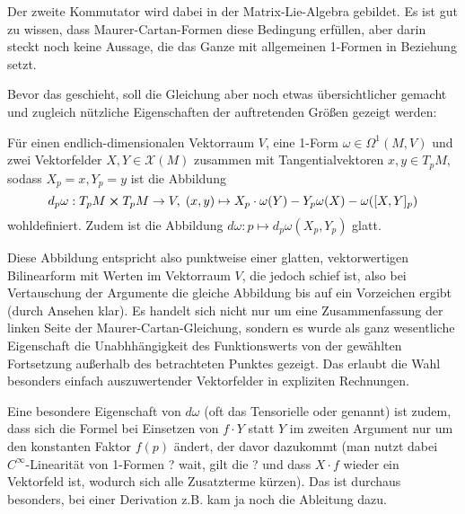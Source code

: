 \documentclass[../H_Analysis_main.tex]{subfiles}
\begin{document}
Der zweite Kommutator wird dabei in der Matrix-Lie-Algebra gebildet. Es ist gut zu wissen, dass Maurer-Cartan-Formen diese Bedingung erfüllen, aber darin steckt noch keine Aussage, die das Ganze mit allgemeinen 1-Formen in Beziehung setzt.

Bevor das geschieht, soll die Gleichung aber noch etwas übersichtlicher gemacht und zugleich nützliche Eigenschaften der auftretenden Größen gezeigt werden:
\begin{lemma}\label{lemma:fakedifferential}
Für einen endlich-dimensionalen Vektorraum $V$, eine 1-Form $\omega \in \Omega^1(M, V)$ und zwei Vektorfelder $X, Y \in \mathcal{X}(M)$ zusammen mit Tangentialvektoren $x, y \in T_p M $, sodass $X_p = x, Y_p = y$ ist die Abbildung
\begin{equation}
d_p \omega: T_p M \cross T_p M \rightarrow V, \; (x, y) \mapsto X_p \cdot \omega(Y) - Y_p \omega(X) - \omega\qty([X, Y]_p)
\end{equation}
wohldefiniert. Zudem ist die Abbildung $d\omega: p \mapsto d_p \omega(X_p, Y_p)$ glatt.
\end{lemma}

Diese Abbildung entspricht also punktweise einer glatten, vektorwertigen Bilinearform mit Werten im Vektorraum $V$, die jedoch schief ist, also bei Vertauschung der Argumente die gleiche Abbildung bis auf ein Vorzeichen ergibt (durch Ansehen klar). Es handelt sich nicht nur um eine Zusammenfassung der linken Seite der Maurer-Cartan-Gleichung, sondern es wurde als ganz wesentliche Eigenschaft die Unabhhängigkeit des Funktionswerts von der gewählten Fortsetzung außerhalb des betrachteten Punktes gezeigt. Das erlaubt die Wahl besonders einfach auszuwertender Vektorfelder in expliziten Rechnungen.

Eine besondere Eigenschaft von $d\omega$ (oft das Tensorielle oder  genannt) ist zudem, dass sich die Formel bei Einsetzen von $f \cdot Y$ statt $Y$ im zweiten Argument nur um den konstanten Faktor $f(p)$ ändert, der davor dazukommt (man nutzt dabei $C^\infty$-Linearität von 1-Formen ? wait, gilt die ? und dass $X \cdot f$ wieder ein Vektorfeld ist, wodurch sich alle Zusatzterme kürzen). Das ist durchaus besonders, bei einer Derivation z.B. kam ja noch die Ableitung dazu.\\
\end{document}
